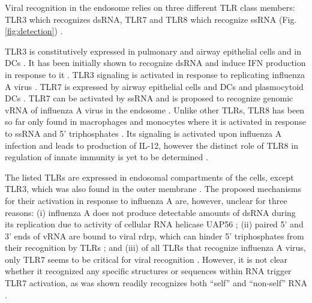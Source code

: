 		Viral recognition in the endosome relies on three different \gls{TLR} class members: \gls{TLR}3 which recognizes dsRNA, \gls{TLR}7 and \gls{TLR}8 which recognize ssRNA (Fig. \ref{fig:detection}) \parencite{Iwasaki2014}. 
		
		\gls{TLR}3 is constitutively expressed in pulmonary and airway epithelial  cells and in \glspl{DC} \parencite{Guillot2005, Schulz2005, Ioannidis2013}. It has been initially shown to recognize dsRNA and induce \gls{IFN} production in response to it \parencite{Alexopoulou2001, Guillot2005}. \gls{TLR}3 signaling is activated in response to replicating influenza A virus \parencite{Guillot2005}. 	\gls{TLR}7 is expressed by airway epithelial cells and \gls{DC}s and plasmocytoid \gls{DC}s \parencite{Ioannidis2013, Lund2004}. \gls{TLR}7 can be activated by \gls{ssRNA} and is proposed to recognize genomic vRNA of influenza A virus in the endosome \parencite{Diebold2004}. Unlike other \glspl{TLR}, \gls{TLR}8 has been so far only found in macrophages and monocytes where it is activated in response to \gls{ssRNA} and 5' triphosphates \parencite{Ablasser2009}. Its signaling is activated upon influenza A infection and leads to production of \gls{IL}-12, however the distinct role of \gls{TLR}8 in regulation of innate immunity is yet to be determined \parencite{Lee2013a}.
		
		
		The listed \gls{TLR}s are expressed in endosomal compartments of the cells, except \gls{TLR}3, which was also found in the outer membrane \parencite{Schulz2005, Ablasser2009, Diebold2004}. The proposed mechanisms for their activation in response to influenza A are, however, unclear for three reasons: (i) influenza A does not produce detectable amounts of dsRNA during its replication due to activity of cellular RNA helicase UAP56 \parencite{Wisskirchen2011}; (ii) paired 5' and 3' ends of vRNA are bound to viral \gls{rdrp}, which can hinder 5' triphosphates from their recognition by \glspl{TLR} \parencite{Arranz2012}; and (iii) of all \glspl{TLR} that recognize influenza A virus, only \gls{TLR}7 seems to be critical for viral recognition \parencite{Lund2004}. However, it is not clear whether it recognized any specific structures or sequences within RNA trigger \gls{TLR}7 activation, as  was shown readily recognizes both ``self'' and ``non-self'' RNA \parencite{Diebold2004}.
		
